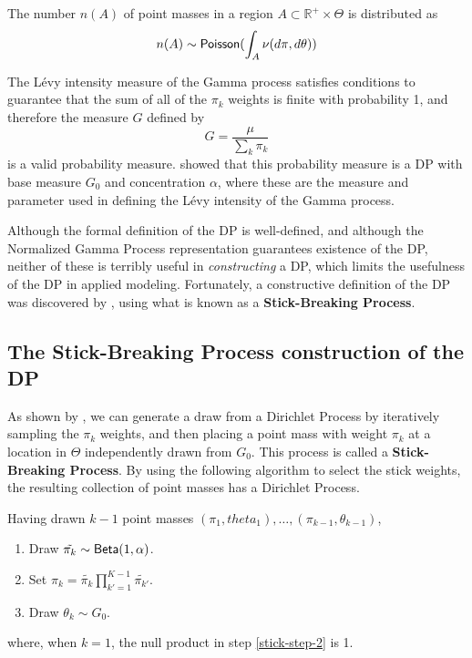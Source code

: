   The number $n(A)$ of point masses in a region $A \subset \mathbb{R}^+ \times \Theta$ is
  distributed as
  \begin{equation}
    \label{eq:9}
    n(A) \sim \mathsf{Poisson}(\int_A \nu(d\pi, d\theta))
  \end{equation}

  The L\'evy intensity measure of the Gamma process satisfies
  conditions to guarantee that the sum of all of the $\pi_k$
  weights is finite with probability 1, and therefore the measure $G$
  defined by
  \begin{equation}
    \label{eq:1}
    G = \frac{\mu}{\sum_k \pi_k}
  \end{equation}
  is a valid probability measure.  \citet{ferguson1973bayesian} showed
  that this probability measure is a DP with base measure $G_0$ and
  concentration $\alpha$, where
  these are the measure and parameter used in defining the L\'evy intensity of the
  Gamma process.

  Although the formal definition of the DP is well-defined, and
  although the Normalized Gamma Process representation guarantees
  existence of the DP, neither of these is terribly useful in {\em
    constructing} a DP, which limits the usefulness of the DP in
  applied modeling.  Fortunately, a constructive definition of the DP
  was discovered by \citet{sethuraman1994constructive}, using what is
  known as a {\bf Stick-Breaking Process}.

  \subsection{The Stick-Breaking Process construction of the DP}
  \label{sec:stick-break-proc}

  As shown by \citet{sethuraman1994constructive}, we can generate a
  draw from a Dirichlet Process by iteratively sampling the $\pi_k$
  weights, and then placing a point mass with weight $\pi_k$ at a
  location in $\Theta$ independently drawn from $G_0$.  This process
  is called a {\bf Stick-Breaking Process}.  By using the following
  algorithm to select the stick weights, the resulting collection of
  point masses has a Dirichlet Process.

  Having drawn $k-1$ point masses $(\pi_1, theta_1), \dots, (\pi_{k-1}, \theta_{k-1})$,
  \begin{enumerate}
  \item \label{stick-step-1} Draw $\tilde{\pi_{k}} \sim \mathsf{Beta}(1,\alpha)$.
  \item \label{stick-step-2} Set $\pi_k = \tilde{\pi_k} \prod_{k'=1}^{K-1}
    \tilde{\pi_{k'}}$.
  \item \label{stick-step-3} Draw $\theta_k \sim G_0$.
  \end{enumerate}
  where, when $k = 1$, the null product in step \ref{stick-step-2} is
  1.

